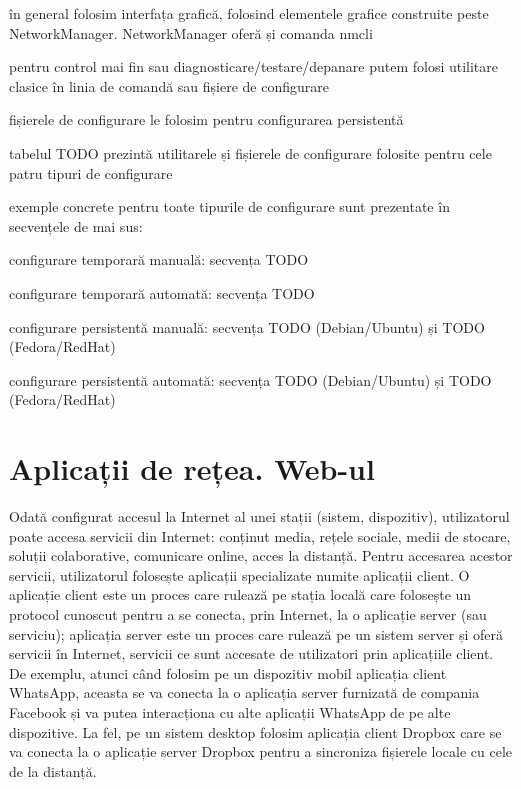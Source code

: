 în general folosim interfața grafică, folosind elementele grafice construite peste NetworkManager. NetworkManager oferă și comanda nmcli

pentru control mai fin sau diagnosticare/testare/depanare putem folosi utilitare clasice în linia de comandă sau fișiere de configurare

fișierele de configurare le folosim pentru configurarea persistentă

tabelul TODO prezintă utilitarele și fișierele de configurare folosite pentru cele patru tipuri de configurare

exemple concrete pentru toate tipurile de configurare sunt prezentate în secvențele de mai sus:

configurare temporară manuală: secvența TODO

configurare temporară automată: secvența TODO

configurare persistentă manuală: secvența TODO (Debian/Ubuntu) și TODO (Fedora/RedHat)

configurare persistentă automată: secvența TODO (Debian/Ubuntu) și TODO (Fedora/RedHat)

\section{Aplicații de rețea. Web-ul}
\label{sec:net:apps}

Odată configurat accesul la Internet al unei stații (sistem, dispozitiv), utilizatorul poate accesa servicii din Internet: conținut media, rețele sociale, medii de stocare, soluții colaborative, comunicare online, acces la distanță. Pentru accesarea acestor servicii, utilizatorul folosește aplicații specializate numite aplicații client. O aplicație client este un proces care rulează pe stația locală care folosește un protocol cunoscut pentru a se conecta, prin Internet, la o aplicație server (sau serviciu); aplicația server este un proces care rulează pe un sistem server și oferă servicii în Internet, servicii ce sunt accesate de utilizatori prin aplicațiile client. De exemplu, atunci când folosim pe un dispozitiv mobil aplicația client WhatsApp, aceasta se va conecta la o aplicația server furnizată de compania Facebook și va putea interacționa cu alte aplicații WhatsApp de pe alte dispozitive. La fel, pe un sistem desktop folosim aplicația client Dropbox care se va conecta la o aplicație server Dropbox pentru a sincroniza fișierele locale cu cele de la distanță.

